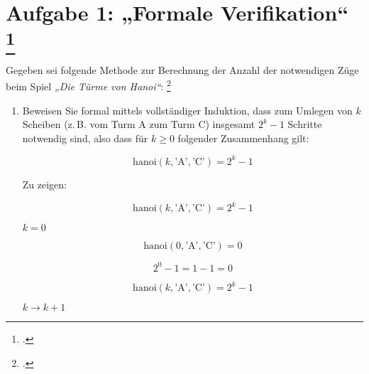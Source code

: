 \documentclass{lehramt-informatik-aufgabe}
\begin{document}

\section{Aufgabe 1: „Formale Verifikation“
\footcite[Thema 2 Teilaufgabe 1 Aufgabe 1]{examen:46116:2014:03}}

Gegeben sei folgende Methode zur Berechnung der Anzahl der notwendigen
Züge beim Spiel \emph{„Die Türme von Hanoi“}:
\footcite{sosy:pu:5:1}


\begin{enumerate}


\item Beweisen Sie formal mittels vollständiger Induktion, dass zum
Umlegen von $k$ Scheiben (z.\,B. vom Turm A zum Turm C) insgesamt
$2^k-1$ Schritte notwendig sind, also dass für $k \geq 0$ folgender
Zusammenhang gilt:

\begin{displaymath}
\text{hanoi}(k,\text{'A'},\text{'C'}) = 2^k - 1
\end{displaymath}

\begin{liAntwort}
Zu zeigen:

\begin{displaymath}
\text{hanoi}(k,\text{'A'},\text{'C'}) = 2^k - 1
\end{displaymath}

%

 $k=0$

\begin{displaymath}
\text{hanoi}(0,\text{'A'},\text{'C'}) = 0
\end{displaymath}

\begin{displaymath}
2^0 - 1 = 1 - 1 = 0
\end{displaymath}

%


\begin{displaymath}
\text{hanoi}(k,\text{'A'},\text{'C'}) = 2^k - 1
\end{displaymath}

%

 $k \rightarrow k + 1$


\end{liAntwort}
\end{enumerate}
\end{document}
